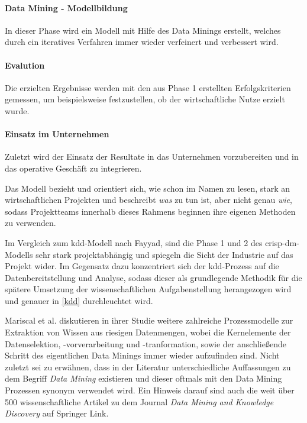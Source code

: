 \paragraph{Data Mining - Modellbildung}
In dieser Phase wird ein Modell mit Hilfe des Data Minings erstellt, welches durch ein iteratives Verfahren immer wieder verfeinert und verbessert wird. 
\paragraph{Evalution}
Die erzielten Ergebnisse werden mit den aus Phase 1 erstellten Erfolgskriterien gemessen, um beispielsweise festzustellen, ob der wirtschaftliche Nutze erzielt wurde.
\paragraph{Einsatz im Unternehmen}
Zuletzt wird der Einsatz der Resultate in das Unternehmen vorzubereiten und in das operative Geschäft zu integrieren.

Das Modell bezieht und orientiert sich, wie schon im Namen zu lesen, stark an wirtschaftlichen Projekten und beschreibt \textit{was} zu tun ist, aber nicht genau \textit{wie}, sodass Projektteams innerhalb dieses Rahmens beginnen ihre eigenen Methoden zu verwenden.

Im Vergleich zum \gls{kdd}-Modell nach Fayyad, sind die Phase 1 und 2 des \gls{crisp-dm}-Modells sehr stark projektabhängig und spiegeln die Sicht der Industrie auf das Projekt wider. Im Gegensatz dazu konzentriert sich der \gls{kdd}-Prozess auf die Datenbereitstellung und Analyse, sodass dieser als grundlegende Methodik für die spätere Umsetzung der wissenschaftlichen Aufgabenstellung herangezogen wird und genauer in \vref{kdd} durchleuchtet wird.

Mariscal et al. diskutieren in ihrer Studie weitere zahlreiche Prozessmodelle zur Extraktion von Wissen aus riesigen Datenmengen, wobei die Kernelemente der Datenselektion, -vorverarbeitung und -tranformation, sowie der anschließende Schritt des eigentlichen Data Minings immer wieder aufzufinden sind. Nicht zuletzt sei zu erwähnen, dass in der Literatur unterschiedliche Auffassungen zu dem Begriff \textit{Data Mining} existieren und dieser oftmals mit den Data Mining Prozessen synonym verwendet wird. Ein Hinweis darauf sind auch die weit über 500 wissenschaftliche Artikel zu dem Journal \textit{Data Mining and Knowledge Discovery} auf Springer Link.

